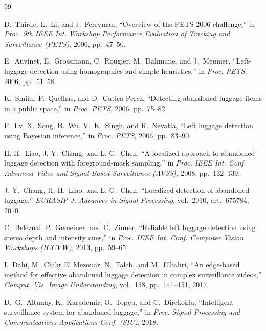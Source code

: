 \begin{thebibliography}{99}
\small

D.~Thirde, L.~Li, and J.~Ferryman, ``Overview of the PETS 2006 challenge,'' in
\emph{Proc. 9th IEEE Int. Workshop Performance Evaluation of Tracking and
Surveillance (PETS)}, 2006, pp.~47--50.

E.~Auvinet, E.~Grossmann, C.~Rougier, M.~Dahmane, and J.~Meunier,
``Left-luggage detection using homographies and simple heuristics,'' in
\emph{Proc. PETS}, 2006, pp.~51--58.

K.~Smith, P.~Quelhas, and D.~Gatica-Perez, ``Detecting abandoned luggage items
in a public space,'' in \emph{Proc. PETS}, 2006, pp.~75--82.

F.~Lv, X.~Song, B.~Wu, V.~K.~Singh, and R.~Nevatia, ``Left luggage detection
using Bayesian inference,'' in \emph{Proc. PETS}, 2006, pp.~83--90.

H.-H.~Liao, J.-Y.~Chang, and L.-G.~Chen, ``A localized approach to abandoned
luggage detection with foreground-mask sampling,'' in \emph{Proc. IEEE Int.
Conf. Advanced Video and Signal Based Surveillance (AVSS)}, 2008, pp.~132--139.

J.-Y.~Chang, H.-H.~Liao, and L.-G.~Chen, ``Localized detection of abandoned
luggage,'' \emph{EURASIP J. Advances in Signal Processing}, vol.~2010,
art.~675784, 2010.

C.~Beleznai, P.~Gemeiner, and C.~Zinner, ``Reliable left luggage detection using
stereo depth and intensity cues,'' in \emph{Proc. IEEE Int. Conf. Computer
Vision Workshops (ICCVW)}, 2013, pp.~59--65.

I.~Dahi, M.~Chikr El Mezouar, N.~Taleb, and M.~Elbahri, ``An edge-based method
for effective abandoned luggage detection in complex surveillance videos,''
\emph{Comput. Vis. Image Understanding}, vol.~158, pp.~141--151, 2017.

D.~G.~Altunay, K.~Karademir, O.~Top\c{c}u, and C.~Direko\u{g}lu, ``Intelligent
surveillance system for abandoned luggage,'' in \emph{Proc. Signal Processing
and Communications Applications Conf. (SIU)}, 2018.


\end{thebibliography}
